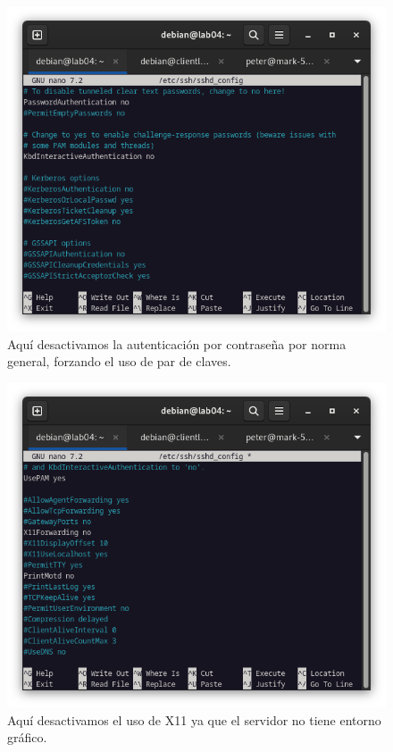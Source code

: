 \begin{figure}[H]
	\centering
	\includegraphics[scale=0.40]{01}
	\caption{Aquí desactivamos la autenticación por contraseña por norma general, forzando el uso de par de claves.}
\end{figure}

\begin{figure}[H]
	\centering
	\includegraphics[scale=0.40]{02}
	\caption{Aquí desactivamos el uso de X11 ya que el servidor no tiene entorno gráfico.}
\end{figure}


